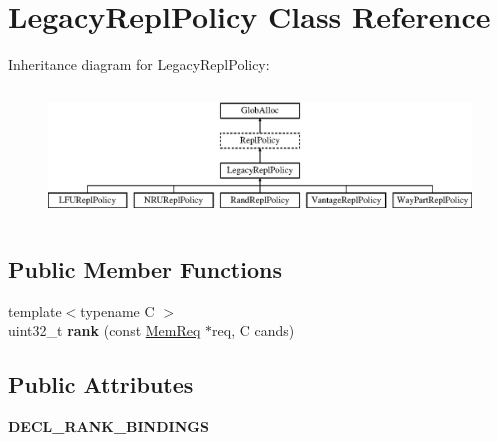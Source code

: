 \hypertarget{classLegacyReplPolicy}{\section{Legacy\-Repl\-Policy Class Reference}
\label{classLegacyReplPolicy}
}
Inheritance diagram for Legacy\-Repl\-Policy\-:\begin{figure}[H]
\begin{center}
\leavevmode
\includegraphics[height=3.500000cm]{classLegacyReplPolicy}
\end{center}
\end{figure}
\subsection*{Public Member Functions}
\begin{DoxyCompactItemize}
\item 
\hypertarget{classLegacyReplPolicy_a4614042323dae45191699811a093ab98}{{\footnotesize template$<$typename C $>$ }\\uint32\-\_\-t {\bfseries rank} (const \hyperlink{structMemReq}{Mem\-Req} $\ast$req, C cands)}\label{classLegacyReplPolicy_a4614042323dae45191699811a093ab98}

\end{DoxyCompactItemize}
\subsection*{Public Attributes}
\begin{DoxyCompactItemize}
\item 
\hypertarget{classLegacyReplPolicy_a78a3fe68b8dfe92cbd7d5b0d3c7b85a0}{{\bfseries D\-E\-C\-L\-\_\-\-R\-A\-N\-K\-\_\-\-B\-I\-N\-D\-I\-N\-G\-S}}\label{classLegacyReplPolicy_a78a3fe68b8dfe92cbd7d5b0d3c7b85a0}

\end{DoxyCompactItemize}
